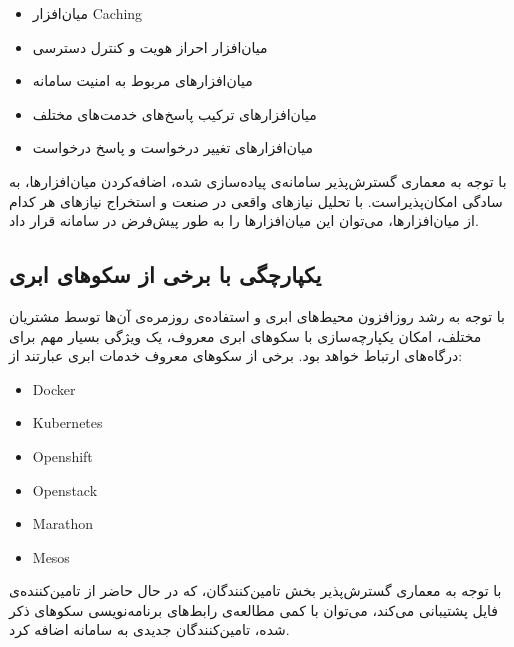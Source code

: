 \begin{itemize}
    \item میان‌افزار Caching
    \item میان‌افزار احراز هویت  و کنترل دسترسی 
    \item میان‌افزار‌های مربوط به امنیت سامانه
    \item میان‌افزار‌های ترکیب پاسخ‌های خدمت‌های مختلف
    \item میان‌افزار‌های تغییر درخواست و پاسخ درخواست
\end{itemize}

با توجه به معماری گسترش‌پذیر سامانه‌ی پیاده‌سازی شده، اضافه‌کردن میان‌افزار‌ها، به سادگی امکان‌پذیراست. با تحلیل نیاز‌های واقعی در صنعت و استخراج نیاز‌های هر کدام از میان‌افزار‌ها،‌ می‌توان این میان‌افزار‌ها را به طور پیش‌فرض در سامانه قرار داد.

\subsection{یکپارچگی با برخی از سکو‌های ابری}\label{subsec:recom_platforms}
با توجه به رشد روز‌افزون محیط‌های ابری و استفاده‌ی روزمره‌ی آن‌ها توسط مشتریان مختلف، امکان یکپارچه‌سازی با سکو‌های ابری معروف، یک ویژگی بسیار مهم برای درگاه‌های ارتباط خواهد بود. برخی از سکو‌های معروف خدمات ابری عبارتند از:

\begin{latin}
    \begin{itemize}
        \item Docker
        \item Kubernetes
        \item Openshift
        \item Openstack
        \item Marathon
        \item Mesos
    \end{itemize}
\end{latin}

با توجه به معماری گسترش‌پذیر بخش تامین‌کنندگان، که در حال حاضر از تامین‌کننده‌ی فایل پشتیبانی می‌کند، می‌توان با کمی مطالعه‌ی رابط‌های برنامه‌نویسی سکو‌های ذکر شده، تامین‌کنندگان جدیدی به سامانه اضافه کرد.


\cleardoublepage 